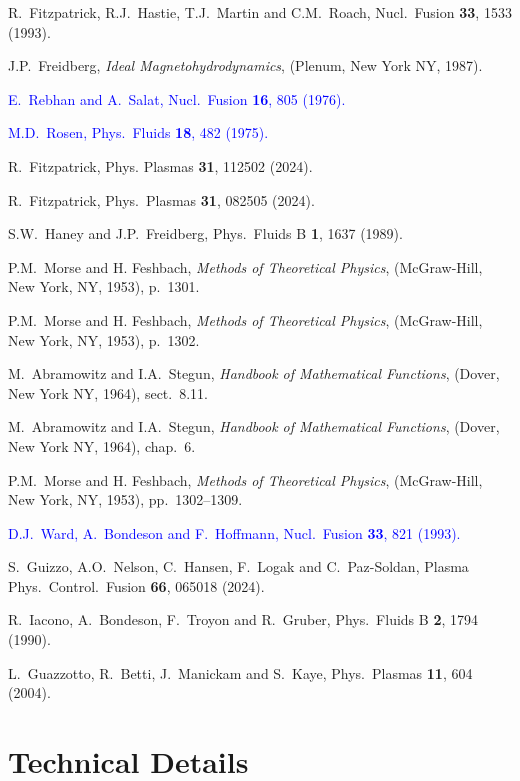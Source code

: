 \documentclass[12pt,prb,aps]{revtex4-1}
\begin{document}
\begin{thebibliography}{99}
 R.~Fitzpatrick, R.J.~Hastie, T.J.~Martin and C.M.~Roach, Nucl.\ Fusion {\bf 33}, 1533 (1993).

 J.P.~Freidberg, {\em Ideal Magnetohydrodynamics}, (Plenum, New York NY, 1987).

\textcolor{blue}{ E.~Rebhan and A.~Salat, Nucl.\ Fusion {\bf 16}, 805 (1976).}

\textcolor{blue}{ M.D.~Rosen, Phys.\ Fluids {\bf 18}, 482 (1975). }

 R.~Fitzpatrick, Phys. Plasmas {\bf 31}, 112502 (2024).

 R.~Fitzpatrick, Phys.\ Plasmas {\bf 31}, 082505 (2024).

 S.W.~Haney and J.P.~Freidberg, Phys.\ Fluids B {\bf 1}, 1637 (1989).

 P.M.~Morse and H. Feshbach, {\em Methods of Theoretical Physics}, (McGraw-Hill, New York, NY, 1953), p.~1301.

 P.M.~Morse and H. Feshbach, {\em Methods of Theoretical Physics}, (McGraw-Hill, New York, NY, 1953), p.~1302.

 M.~Abramowitz and I.A.~Stegun, {\em Handbook of Mathematical Functions}, (Dover, New York NY, 1964), sect.~8.11.

 M.~Abramowitz and I.A.~Stegun, {\em Handbook of Mathematical Functions}, (Dover, New York NY, 1964), chap.~6.

 P.M.~Morse and H. Feshbach, {\em Methods of Theoretical Physics}, (McGraw-Hill, New York, NY, 1953), pp.~1302--1309.

\textcolor{blue}{  D.J.~Ward,  A.~Bondeson and F.~Hoffmann, Nucl.\ Fusion {\bf 33}, 821 (1993). }

 S.~Guizzo, A.O.~Nelson, C.~Hansen, F.~Logak and C.~Paz-Soldan, Plasma Phys.\ Control.\ Fusion {\bf 66},  065018  (2024).  

 R.~Iacono, A.~Bondeson, F.~Troyon and R.~Gruber, Phys.\ Fluids B {\bf 2}, 1794 (1990).

 L.~Guazzotto,  R.~Betti, J.~Manickam and  S.~Kaye, Phys.\ Plasmas {\bf 11}, 604 (2004).

\end{thebibliography}

\appendix
\section{Technical Details}
\end{document}
